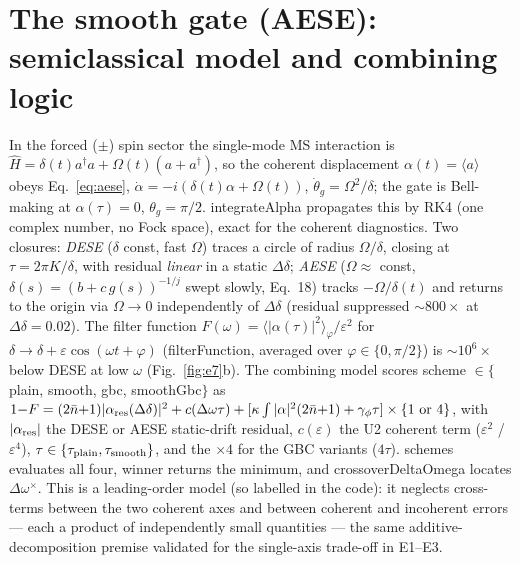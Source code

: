 \documentclass[aps,prapplied,twocolumn,superscriptaddress,floatfix,nofootinbib]{revtex4-2}
\begin{document}
\section{The smooth gate (AESE): semiclassical model and combining logic}\label{app:smooth}
In the forced ($\pm$) spin sector the single-mode MS interaction is
$\hat H=\delta(t)a^\dagger a+\Omega(t)(a+a^\dagger)$, so the coherent displacement
$\alpha(t)=\langle a\rangle$ obeys Eq.~\eqref{eq:aese}, $\dot\alpha=-i(\delta(t)\alpha+\Omega(t))$,
$\dot\theta_g=\Omega^2/\delta$; the gate is Bell-making at $\alpha(\tau)=0$, $\theta_g=\pi/2$.
\textsf{integrateAlpha} propagates this by RK4 (one complex number, no Fock space), exact for the
coherent diagnostics. Two closures: \emph{DESE} ($\delta$ const, fast $\Omega$) traces a circle of
radius $\Omega/\delta$, closing at $\tau=2\pi K/\delta$, with residual \emph{linear} in a static
$\Delta\delta$; \emph{AESE} ($\Omega\approx$ const, $\delta(s)=(b+c\,g(s))^{-1/j}$ swept slowly,
\cite{Hughes25} Eq.~18) tracks $-\Omega/\delta(t)$ and returns to the origin via $\Omega\!\to\!0$
independently of $\Delta\delta$ (residual suppressed $\sim\!800\times$ at $\Delta\delta=0.02$). The
filter function $F(\omega)=\langle|\alpha(\tau)|^2\rangle_\varphi/\varepsilon^2$ for
$\delta\!\to\!\delta+\varepsilon\cos(\omega t+\varphi)$ (\textsf{filterFunction}, averaged over
$\varphi\in\{0,\pi/2\}$) is $\sim\!10^{6}\times$ below DESE at low $\omega$ (Fig.~\ref{fig:e7}b).
The combining model scores scheme $\in\{$plain, smooth, gbc, smoothGbc$\}$ as
$1{-}F=(2\bar n{+}1)|\alpha_{\rm res}(\Delta\delta)|^2+c(\Delta\omega\tau)+[\kappa\int|\alpha|^2(2\bar n{+}1)+\gamma_\phi\tau]\times\{1\text{ or }4\}$,
with $|\alpha_{\rm res}|$ the DESE or AESE static-drift residual, $c(\varepsilon)$ the U2 coherent
term ($\varepsilon^2$ / $\varepsilon^4$), $\tau\in\{\tau_{\rm plain},\tau_{\rm smooth}\}$, and the
$\times4$ for the GBC variants ($4\tau$). \textsf{schemes} evaluates all four, \textsf{winner}
returns the minimum, and \textsf{crossoverDeltaOmega} locates $\Delta\omega^\times$. This is a
leading-order model (so labelled in the code): it neglects cross-terms between the two coherent axes
and between coherent and incoherent errors --- each a product of independently small quantities ---
the same additive-decomposition premise validated for the single-axis trade-off in E1--E3.



\end{document}
